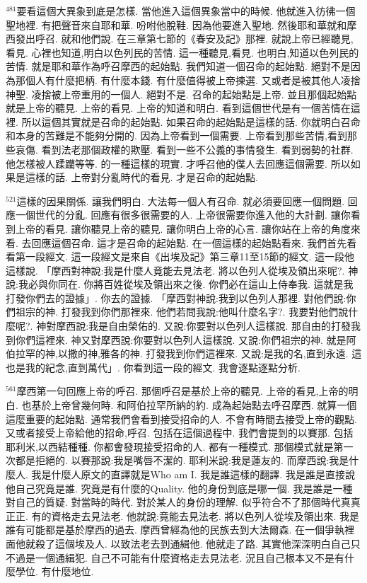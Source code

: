 \documentclass{book}
\begin{document}
$^{481}$要看這個大異象到底是怎樣.
當他進入這個異象當中的時候.
他就進入彷彿一個聖地裡.
有把聲音來自耶和華.
吩咐他脫鞋.
因為他要進入聖地.
然後耶和華就和摩西發出呼召.
就和他們說.
在三章第七節的《春安及記》那裡.
就說上帝已經聽見,看見.
心裡也知道,明白以色列民的苦情.
這一種聽見,看見.
也明白,知道以色列民的苦情.
就是耶和華作為呼召摩西的起始點.
我們知道一個召命的起始點.
絕對不是因為那個人有什麼把柄.
有什麼本錢.
有什麼值得被上帝揀選.
又或者是被其他人凌捨神聖.
凌捨被上帝重用的一個人.
絕對不是.
召命的起始點是上帝.
並且那個起始點就是上帝的聽見.
上帝的看見.
上帝的知道和明白.
看到這個世代是有一個苦情在這裡.
所以這個其實就是召命的起始點.
如果召命的起始點是這樣的話.
你就明白召命和本身的苦難是不能夠分開的.
因為上帝看到一個需要.
上帝看到那些苦情,看到那些哀傷.
看到法老那個政權的欺壓.
看到一些不公義的事情發生.
看到弱勢的社群.
他怎樣被人蹂躪等等.
的一種這樣的現實.
才呼召他的僕人去回應這個需要.
所以如果是這樣的話.
上帝對分亂時代的看見.
才是召命的起始點.

$^{521}$這樣的因果關係.
讓我們明白.
大法每一個人有召命.
就必須要回應一個問題.
回應一個世代的分亂.
回應有很多很需要的人.
上帝很需要你進入他的大計劃.
讓你看到上帝的看見.
讓你聽見上帝的聽見.
讓你明白上帝的心言.
讓你站在上帝的角度來看.
去回應這個召命.
這才是召命的起始點.
在一個這樣的起始點看來.
我們首先看看第一段經文.
這一段經文是來自《出埃及記》第三章11至15節的經文.
這一段他這樣說.
「摩西對神說:我是什麼人竟能去見法老.
將以色列人從埃及領出來呢?.
神說:我必與你同在.
你將百姓從埃及領出來之後.
你們必在這山上侍奉我.
這就是我打發你們去的證據」.
你去的證據.
「摩西對神說:我到以色列人那裡.
對他們說:你們祖宗的神.
打發我到你們那裡來.
他們若問我說:他叫什麼名字?.
我要對他們說什麼呢?.
神對摩西說:我是自由榮佑的.
又說:你要對以色列人這樣說.
那自由的打發我到你們這裡來.
神又對摩西說:你要對以色列人這樣說.
又說:你們祖宗的神.
就是阿伯拉罕的神,以撒的神,雅各的神.
打發我到你們這裡來.
又說:是我的名,直到永遠.
這也是我的紀念,直到萬代」.
你看到這一段的經文.
我會逐點逐點分析.

$^{561}$摩西第一句回應上帝的呼召.
那個呼召是基於上帝的聽見.
上帝的看見,上帝的明白.
也基於上帝曾幾何時.
和阿伯拉罕所納的約.
成為起始點去呼召摩西.
就算一個這麼重要的起始點.
通常我們會看到接受招命的人.
不會有時間去接受上帝的觀點.
又或者接受上帝給他的招命,呼召.
包括在這個過程中.
我們會提到的以賽那.
包括耶利米,以西結種種.
你都會發現接受招命的人.
都有一種模式.
那個模式就是第一次都是拒絕的.
以賽那說:我是嘴唇不潔的.
耶利米說:我是蓮友的.
而摩西說:我是什麼人.
我是什麼人原文的直譯就是Who am I.
我是誰這樣的翻譯.
我是誰是直接說他自己究竟是誰.
究竟是有什麼的Quality.
他的身份到底是哪一個.
我是誰是一種對自己的質疑.
對當時的時代.
對於某人的身份的理解.
似乎符合不了那個時代真真正正.
有的資格走去見法老.
他就說:竟能去見法老.
將以色列人從埃及領出來.
我是誰有可能都是基於摩西的過去.
摩西曾經為他的民族去到大法爾森.
在一個爭執裡面他就殺了這個埃及人.
以致法老去到通緝他.
他就走了路.
其實他深深明白自己只不過是一個通緝犯.
自己不可能有什麼資格走去見法老.
況且自己根本又不是有什麼學位.
有什麼地位.
\end{document}
